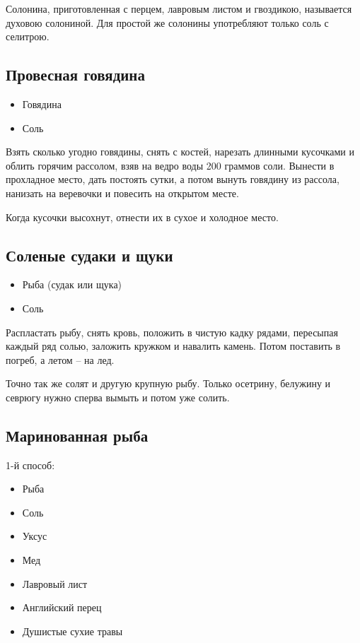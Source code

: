 Солонина, приготовленная с перцем, лавровым листом и гвоздикою, называется духовою солониной. Для простой же солонины употребляют только соль с селитрою.

\subsection{Провесная говядина}

\begin{itemize}
	\item Говядина 
    \item Соль
\end{itemize}

Взять сколько угодно говядины, снять с костей, нарезать длинными кусочками и облить горячим рассолом, взяв на ведро воды 200 граммов соли. Вынести в прохладное место, дать постоять сутки, а потом вынуть говядину из рассола, нанизать на веревочки и повесить на открытом месте.

Когда кусочки высохнут, отнести их в сухое и холодное место.

\subsection{Соленые судаки и щуки}

\begin{itemize}
	\item Рыба (судак или щука) 
    \item Соль
\end{itemize}

Распластать рыбу, снять кровь, положить в чистую кадку рядами, пересыпая каждый ряд солью, заложить кружком и навалить камень. Потом поставить в погреб, а летом – на лед.

Точно так же солят и другую крупную рыбу. Только осетрину, белужину и севрюгу нужно сперва вымыть и потом уже солить.

\subsection{Маринованная рыба}\label{4marinov-ryba}

1-й способ: 

\begin{itemize}
	\item Рыба
    \item Соль 
    \item Уксус
    \item Мед
    \item Лавровый лист
    \item Английский перец
    \item Душистые сухие травы
\end{itemize}

